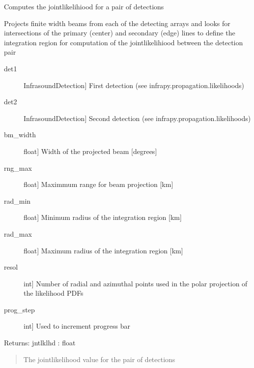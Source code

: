 \documentclass[letterpaper,10pt,english]{sphinxmanual}
\begin{document}
\begin{fulllineitems}
\label{\detokenize{infrapy.association:infrapy.association.hjl.compute_assoc_pair}}
Computes the joint\sphinxhyphen{}likelihiood for a pair of detections

Projects finite width beams from each of the detecting arrays and looks for intersections
of the primary (center) and secondary (edge) lines to define the integration region
for computation of the joint\sphinxhyphen{}likelihiood between the detection pair
\begin{description}
\item[{det1}] \leavevmode{[}InfrasoundDetection{]}
First detection (see infrapy.propagation.likelihoods)

\item[{det2}] \leavevmode{[}InfrasoundDetection{]}
Second detection (see infrapy.propagation.likelihoods)

\item[{bm\_width}] \leavevmode{[}float{]}
Width of the projected beam {[}degrees{]}

\item[{rng\_max}] \leavevmode{[}float{]}
Maximmum range for beam projection {[}km{]}

\item[{rad\_min}] \leavevmode{[}float{]}
Minimum radius of the integration region {[}km{]}

\item[{rad\_max}] \leavevmode{[}float{]}
Maximum radius of the integration region {[}km{]}

\item[{resol}] \leavevmode{[}int{]}
Number of radial and azimuthal points used in the polar projection of the likelihood PDFs

\item[{prog\_step}] \leavevmode{[}int{]}
Used to increment progress bar

\end{description}

Returns:
jntlklhd : float
\begin{quote}

The joint\sphinxhyphen{}likelihood value for the pair of detections
\end{quote}

\end{fulllineitems}
\end{document}
